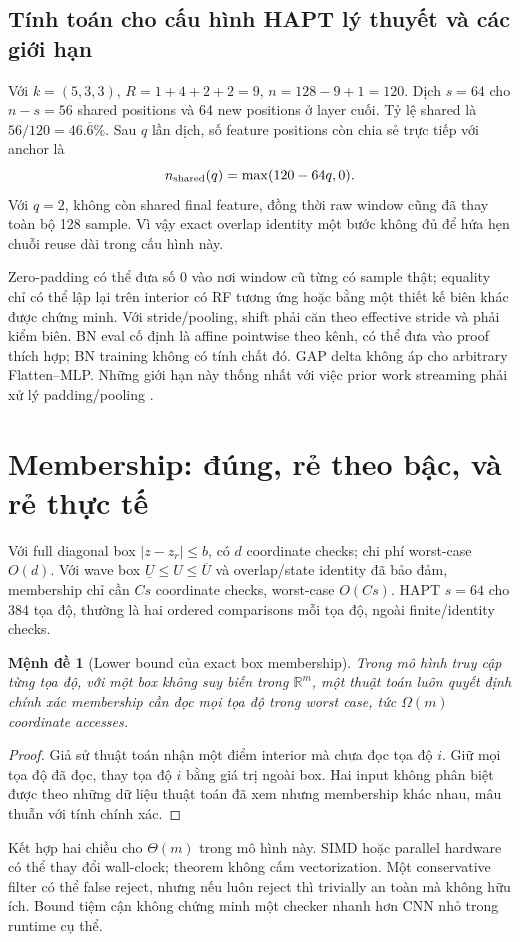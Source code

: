 \documentclass[11pt,a4paper]{article}
\newcommand{\R}{\mathbb R}
\newtheorem{proposition}[definition]{Mệnh đề}
\theoremstyle{remark}
\begin{document}
\subsection{Tính toán cho cấu hình HAPT lý thuyết và các giới hạn}
Với $k=(5,3,3)$, $R=1+4+2+2=9$, $n=128-9+1=120$.
Dịch $s=64$ cho $n-s=56$ shared positions và 64 new positions ở layer
cuối. Tỷ lệ shared là $56/120=46.\overline6\%$. Sau $q$ lần dịch, số
feature positions còn chia sẻ trực tiếp với anchor là
\begin{equation}
 n_{\rm shared}(q)=\max(120-64q,0).
\end{equation}
Với $q=2$, không còn shared final feature, đồng thời raw window cũng đã
thay toàn bộ 128 sample. Vì vậy exact overlap identity một bước không đủ
để hứa hẹn chuỗi reuse dài trong cấu hình này.

Zero-padding có thể đưa số 0 vào nơi window cũ từng có sample thật; equality
chỉ có thể lập lại trên interior có RF tương ứng hoặc bằng một thiết kế
biên khác được chứng minh. Với stride/pooling, shift phải căn theo effective
stride và phải kiểm biên. BN eval cố định là affine pointwise theo kênh,
có thể đưa vào proof thích hợp; BN training không có tính chất đó. GAP
delta không áp cho arbitrary Flatten--MLP. Những giới hạn này thống nhất
với việc prior work streaming phải xử lý padding/pooling \cite{streaminnc}.

\section{Membership: đúng, rẻ theo bậc, và rẻ thực tế}
Với full diagonal box $|z-z_r|\le b$, có $d$ coordinate checks; chi phí
worst-case $O(d)$. Với wave box $\underline U\le U\le\overline U$ và
overlap/state identity đã bảo đảm, membership chỉ cần $Cs$ coordinate
checks, worst-case $O(Cs)$. HAPT $s=64$ cho 384 tọa độ, thường là hai
ordered comparisons mỗi tọa độ, ngoài finite/identity checks.

\begin{proposition}[Lower bound của exact box membership]
Trong mô hình truy cập từng tọa độ, với một box không suy biến trong
$\R^m$, một thuật toán luôn quyết định chính xác membership cần đọc mọi
tọa độ trong worst case, tức $\Omega(m)$ coordinate accesses.
\end{proposition}
\begin{proof}
Giả sử thuật toán nhận một điểm interior mà chưa đọc tọa độ $i$. Giữ mọi
tọa độ đã đọc, thay tọa độ $i$ bằng giá trị ngoài box. Hai input không phân
biệt được theo những dữ liệu thuật toán đã xem nhưng membership khác nhau,
mâu thuẫn với tính chính xác.
\end{proof}
Kết hợp hai chiều cho $\Theta(m)$ trong mô hình này. SIMD hoặc parallel
hardware có thể thay đổi wall-clock; theorem không cấm vectorization.
Một conservative filter có thể false reject, nhưng nếu luôn reject thì
trivially an toàn mà không hữu ích. Bound tiệm cận không chứng minh một
checker nhanh hơn CNN nhỏ trong runtime cụ thể.
\end{document}
